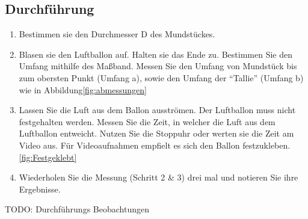 \documentclass{article}
\begin{document}
    \subsection{Durchführung}
    \begin{enumerate}
        \item Bestimmen sie den Durchmesser D des Mundstückes.
        \item Blasen sie den Luftballon auf. Halten sie das Ende zu. Bestimmen Sie den Umfang mithilfe des Maßband.
        Messen Sie den Umfang von Mundstück bis zum obersten Punkt (Umfang a), sowie den Umfang der \enquote{Tallie} (Umfang b) wie in Abbildung\ref{fig:abmessungen}
        \item Lassen Sie die Luft aus dem Ballon ausströmen. Der Luftballon muss nicht festgehalten werden.
        Messen Sie die Zeit, in welcher die Luft aus dem Luftballon entweicht.
        Nutzen Sie die Stoppuhr oder werten sie die Zeit am Video aus. Für Videoaufnahmen empfielt es sich den Ballon festzukleben.\ref{fig:Festgeklebt}
        \item Wiederholen Sie die Messung (Schritt 2 \& 3) drei mal und notieren Sie ihre Ergebnisse.
    \end{enumerate}
    TODO: Durchführungs Beobachtungen
\end{document}
